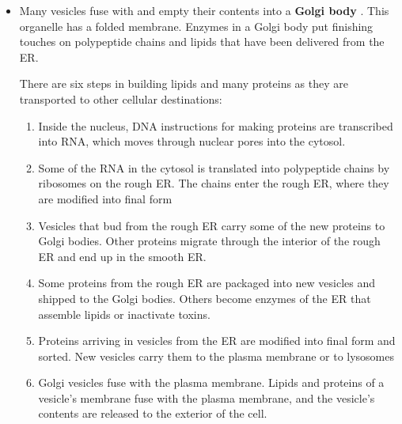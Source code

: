 \documentclass[letterpaper]{article}
\begin{document}
\begin{itemize}
    \item Many vesicles fuse with and empty their contents into a \textbf{Golgi body} . This organelle has a folded membrane. Enzymes in a Golgi body put finishing touches on polypeptide chains and lipids that have been delivered from the ER.
    \begin{review}
        There are six steps in building lipids and many proteins as they are transported to other cellular destinations:
        \begin{enumerate}
            \item Inside the nucleus, DNA instructions for making proteins are transcribed into RNA, which moves through nuclear pores into the cytosol.
            \item Some of the RNA in the cytosol is translated into polypeptide chains by ribosomes on the rough ER. The chains enter the rough ER, where they are modified into final form
            \item Vesicles that bud from the rough ER carry some of the new
            proteins to Golgi bodies. Other proteins migrate through the interior of the rough ER and end up in the smooth ER.
            \item Some proteins from the rough ER are packaged into new vesicles and shipped to the Golgi bodies. Others become enzymes of the ER that assemble lipids or inactivate toxins.
            \item Proteins arriving in vesicles from the ER are modified into final form and sorted. New vesicles carry them to the plasma membrane or to lysosomes
            \item Golgi vesicles fuse with the plasma membrane. Lipids and proteins of a vesicle's membrane fuse with the plasma membrane, and the vesicle’s contents are released to the exterior of the cell.
        \end{enumerate}
    \end{review}

\end{itemize}
\end{document}
